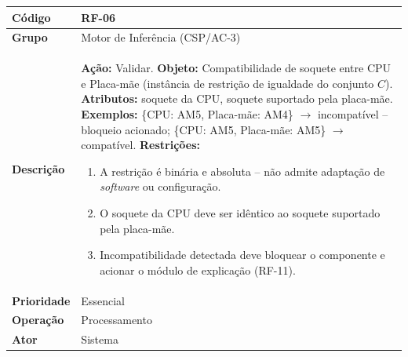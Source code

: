 \FloatBarrier
\begin{quadro}[htb]
  \caption{RF-06 -- Validar compatibilidade de soquete CPU--Placa-mãe}
  \label{quad:rf06}
  \begin{tabular}{|p{3.2cm}|p{11.8cm}|}
    \hline
    \textbf{Código}     & RF-06                                                                             \\ \hline
    \textbf{Grupo}      & Motor de Inferência (CSP/AC-3)                                                    \\ \hline
    \textbf{Descrição}  &
    \textbf{Ação:} Validar.
    \textbf{Objeto:} Compatibilidade de soquete entre CPU e Placa-mãe (instância de restrição de igualdade do conjunto $C$).
    \textbf{Atributos:} soquete da CPU, soquete suportado pela placa-mãe.
    \textbf{Exemplos:} \{CPU: AM5, Placa-mãe: AM4\} $\rightarrow$ incompatível -- bloqueio acionado; \{CPU: AM5, Placa-mãe: AM5\} $\rightarrow$ compatível.
    \textbf{Restrições:}
    \begin{enumerate}[nosep,leftmargin=1.2em,topsep=2pt,partopsep=0pt,parsep=0pt,itemsep=1pt]
      \item A restrição é binária e absoluta -- não admite adaptação de \textit{software} ou configuração.
      \item O soquete da CPU deve ser idêntico ao soquete suportado pela placa-mãe.
      \item Incompatibilidade detectada deve bloquear o componente e acionar o módulo de explicação (RF-11).
    \end{enumerate} \\ \hline
    \textbf{Prioridade} & Essencial                                                                         \\ \hline
    \textbf{Operação}   & Processamento                                                                     \\ \hline
    \textbf{Ator}       & Sistema                                                                           \\ \hline
  \end{tabular}
\end{quadro}

